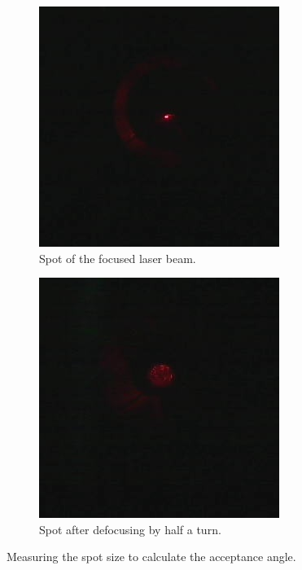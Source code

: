 \documentclass[a4paper, 12pt]{paper}
\begin{document}
\begin{figure}[H]
    \centering
    \begin{subfigure}[b]{0.45\textwidth}
        \includegraphics[width=\textwidth]{img/focus_cropped}
        \caption{Spot of the focused laser beam.}
    \end{subfigure}
    \begin{subfigure}[b]{0.45\textwidth}
        \includegraphics[width=\textwidth]{img/050_cropped}
        \caption{Spot after defocusing by half a turn.}
    \end{subfigure}
    \caption{Measuring the spot size to calculate the acceptance angle.}
\label{fig:spot}
\end{figure}
\end{document}
